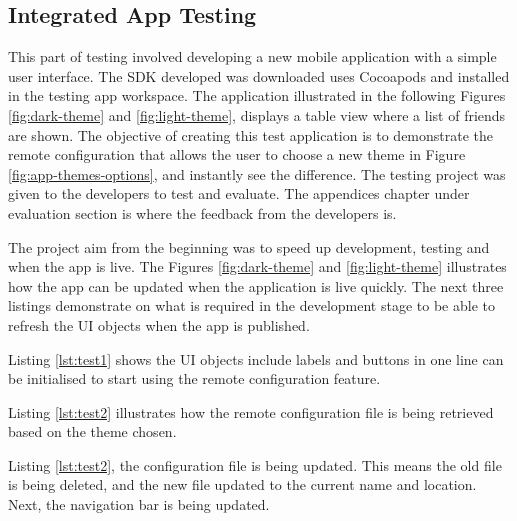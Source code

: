 \newpage

\subsection{Integrated App Testing}

This part of testing involved developing a new mobile application with a simple user interface. The SDK developed was downloaded uses Cocoapods and installed in the testing app workspace. The application illustrated in the following Figures \ref{fig:dark-theme} and \ref{fig:light-theme}, displays a table view where a list of friends are shown. The objective of creating this test application is to demonstrate the remote configuration that allows the user to choose a new theme in Figure \ref{fig:app-themes-options}, and instantly see the difference. The testing project was given to the developers to test and evaluate. The appendices chapter under evaluation section is where the feedback from the developers is.

The project aim from the beginning was to speed up development, testing and when the app is live. The Figures \ref{fig:dark-theme} and \ref{fig:light-theme} illustrates how the app can be updated when the application is live quickly. The next three listings demonstrate on what is required in the development stage to be able to refresh the UI objects when the app is published.

Listing \ref{lst:test1} shows the UI objects include labels and buttons in one line can be initialised to start using the remote configuration feature.



Listing \ref{lst:test2} illustrates how the remote configuration file is being retrieved based on the theme chosen.



Listing \ref{lst:test2}, the configuration file is being updated. This means the old file is being deleted, and the new file updated to the current name and location. Next, the navigation bar is being updated.



